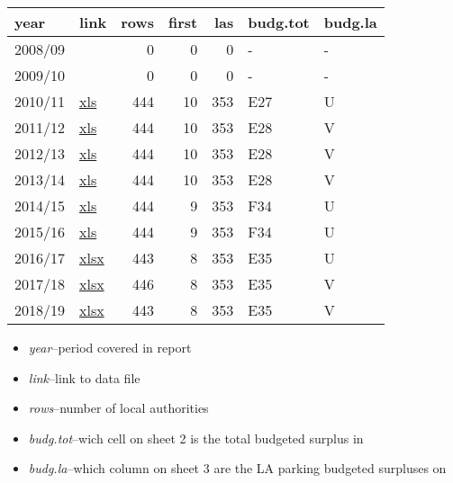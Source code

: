 \documentclass[]{article}
\providecommand{\tightlist}{%
  \setlength{\itemsep}{0pt}\setlength{\parskip}{0pt}}
\begin{document}
\begin{tabular}{llrrrll}
\toprule
year & link & rows & first & las & budg.tot & budg.la\\
\midrule
2008/09 &  & 0 & 0 & 0 & - & -\\
\cmidrule{1-7}
2009/10 &  & 0 & 0 & 0 & - & -\\
\cmidrule{1-7}
2010/11 & \href{https://www.gov.uk/government/uploads/system/uploads/attachment_data/file/7367/1934015.xls}{xls} & 444 & 10 & 353 & E27 & U\\
\cmidrule{1-7}
2011/12 & \href{https://www.gov.uk/government/uploads/system/uploads/attachment_data/file/7369/2179334.xls}{xls} & 444 & 10 & 353 & E28 & V\\
\cmidrule{1-7}
2012/13 & \href{https://www.gov.uk/government/uploads/system/uploads/attachment_data/file/78647/RA_2012-13_data_by_LA_-_Nat_Stats_Release_-_Revised_31-Jul-2013.xls}{xls} & 444 & 10 & 353 & E28 & V\\
\cmidrule{1-7}
2013/14 & \href{https://www.gov.uk/government/uploads/system/uploads/attachment_data/file/225875/RA_2013-14_data_by_LA_-_Nat_Stats_Release_-_31-Jul-2013.xls}{xls} & 444 & 10 & 353 & E28 & V\\
\cmidrule{1-7}
2014/15 & \href{https://www.gov.uk/government/uploads/system/uploads/attachment_data/file/365591/RA_2014-15_data_by_LA_-_Nat_Stats_Release_-_Revised_22-Oct-2014.xls}{xls} & 444 & 9 & 353 & F34 & U\\
\cmidrule{1-7}
2015/16 & \href{https://www.gov.uk/government/uploads/system/uploads/attachment_data/file/444910/RA_2015-16_data_by_LA_-_Nat_Stats_Release_-_15-Jul-2015.xls}{xls} & 444 & 9 & 353 & F34 & U\\
\cmidrule{1-7}
2016/17 & \href{https://www.gov.uk/government/uploads/system/uploads/attachment_data/file/532962/RA_2016-17_data_by_LA.xlsx}{xlsx} & 443 & 8 & 353 & E35 & U\\
\cmidrule{1-7}
2017/18 & \href{https://www.gov.uk/government/uploads/system/uploads/attachment_data/file/623097/RA_2017-18_data_by_LA.xlsx}{xlsx} & 446 & 8 & 353 & E35 & V\\
\cmidrule{1-7}
2018/19 & \href{https://www.gov.uk/government/uploads/system/uploads/attachment_data/file/720343/RA_2018-19_data_by_LA.xlsx}{xlsx} & 443 & 8 & 353 & E35 & V\\
\bottomrule
\end{tabular}

\begin{itemize}
\tightlist
\item
  \emph{year}--period covered in report
\item
  \emph{link}--link to data file
\item
  \emph{rows}--number of local authorities
\item
  \emph{budg.tot}--wich cell on sheet 2 is the total budgeted surplus in
\item
  \emph{budg.la}--which column on sheet 3 are the LA parking budgeted
  surpluses on
\end{itemize}
\end{document}
